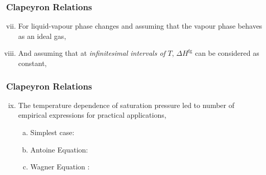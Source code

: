 \documentclass[10pt,compress,handout,unknownkeysallowed]{beamer}
\begin{document}
\begin{frame}
  \frametitle{Clapeyron Relations}
     \begin{enumerate}[i)]\setcounter{enumi}{6}
         \item<1-> For liquid-vapour phase changes and assuming that the vapour phase behaves as an ideal gas, 
         \item<2-> And assuming that at {\it infinitesimal intervals of } $T$, $\Delta H^{\text{fg}}$ can be considered as constant,
     \end{enumerate}

\end{frame}
\normalsize


\begin{frame}
  \frametitle{Clapeyron Relations}
     \begin{enumerate}[i)]\setcounter{enumi}{8}
         \item<1-> The temperature dependence of saturation pressure led to number of empirical expressions for practical applications, \eg
         \begin{enumerate}[a)]
            \item<2-> Simplest case:
            \item<3-> Antoine Equation:
            \item<4-> Wagner Equation :
         \end{enumerate}
     \end{enumerate}

\end{frame}
\normalsize
\end{document}

